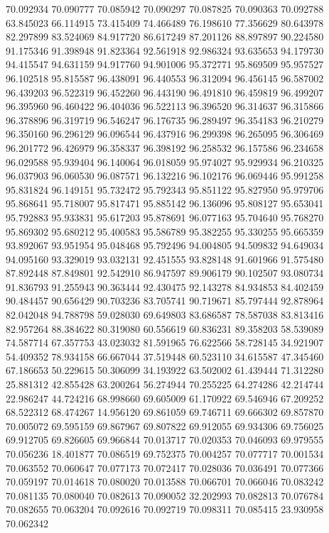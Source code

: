 70.092934
70.090777
70.085942
70.090297
70.087825
70.090363
70.092788
63.845023
66.114915
73.415409
74.466489
76.198610
77.356629
80.643978
82.297899
83.524069
84.917720
86.617249
87.201126
88.897897
90.224580
91.175346
91.398948
91.823364
92.561918
92.986324
93.635653
94.179730
94.415547
94.631159
94.917760
94.901006
95.372771
95.869509
95.957527
96.102518
95.815587
96.438091
96.440553
96.312094
96.456145
96.587002
96.439203
96.522319
96.452260
96.443190
96.491810
96.459819
96.499207
96.395960
96.460422
96.404036
96.522113
96.396520
96.314637
96.315866
96.378896
96.319719
96.546247
96.176735
96.289497
96.354183
96.210279
96.350160
96.296129
96.096544
96.437916
96.299398
96.265095
96.306469
96.201772
96.426979
96.358337
96.398192
96.258532
96.157586
96.234658
96.029588
95.939404
96.140064
96.018059
95.974027
95.929934
96.210325
96.037903
96.060530
96.087571
96.132216
96.102176
96.069446
95.991258
95.831824
96.149151
95.732472
95.792343
95.851122
95.827950
95.979706
95.868641
95.718007
95.817471
95.885142
96.136096
95.808127
95.653041
95.792883
95.933831
95.617203
95.878691
96.077163
95.704640
95.768270
95.869302
95.680212
95.400583
95.586789
95.382255
95.330255
95.665359
93.892067
93.951954
95.048468
95.792496
94.004805
94.509832
94.649034
94.095160
93.329019
93.032131
92.451555
93.828148
91.601966
91.575480
87.892448
87.849801
92.542910
86.947597
89.906179
90.102507
93.080734
91.836793
91.255943
90.363444
92.430475
92.143278
84.934853
84.402459
90.484457
90.656429
90.703236
83.705741
90.719671
85.797444
92.878964
82.042048
94.788798
59.028030
69.649803
83.686587
78.587038
83.813416
82.957264
88.384622
80.319080
60.556619
60.836231
89.358203
58.539089
74.587714
67.357753
43.023032
81.591965
76.622566
58.728145
34.921907
54.409352
78.934158
66.667044
37.519448
60.523110
34.615587
47.345460
67.186653
50.229615
50.306099
34.193922
63.502002
61.439444
71.312280
25.881312
42.855428
63.200264
56.274944
70.255225
64.274286
42.214744
22.986247
44.724216
68.998660
69.605009
61.170922
69.546946
67.209252
68.522312
68.474267
14.956120
69.861059
69.746711
69.666302
69.857870
70.005072
69.595159
69.867967
69.807822
69.912055
69.934306
69.756025
69.912705
69.826605
69.966844
70.013717
70.020353
70.046093
69.979555
70.056236
18.401877
70.086519
69.752375
70.004257
70.077717
70.001534
70.063552
70.060647
70.077173
70.072417
70.028036
70.036491
70.077366
70.059197
70.014618
70.080020
70.013588
70.066701
70.066046
70.083242
70.081135
70.080040
70.082613
70.090052
32.202993
70.082813
70.076784
70.082655
70.063204
70.092616
70.092719
70.098311
70.085415
23.930958
70.062342
